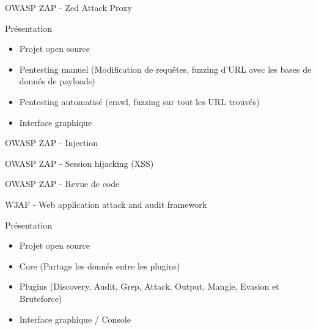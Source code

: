 \documentclass{beamer}
\begin{document}
\begin{frame}{OWASP ZAP - Zed Attack Proxy}
\begin{block}{Présentation}
	\begin{itemize}
		\item Projet open source \href{https://github.com/zaproxy/zaproxy/}{}
		\item Pentesting manuel (Modification de requêtes, fuzzing d'URL avec les bases de donnés de payloads)
		\item Pentesting automatisé (crawl, fuzzing sur tout les URL trouvés) 
		\item Interface graphique
	\end{itemize}	
\end{block}
\end{frame}



\begin{frame}{OWASP ZAP - Injection}
\begin{center}
\end{center} 
\end{frame}

\begin{frame}{OWASP ZAP - Session hijacking (XSS)}
	\begin{center}
	\end{center} 
\end{frame}

\begin{frame}{OWASP ZAP - Revue de code}
	\begin{center}
	\end{center} 
\end{frame}


\begin{frame}{ W3AF - Web application attack and audit framework}
\begin{block}{Présentation}
	\begin{itemize}
		\item Projet open source \href{http://w3af.org/}{}
		\item Core (Partage les donnés entre les plugins)
		\item Plugins (Discovery, Audit, Grep, Attack, Output, Mangle, Evasion et Bruteforce)
		\item Interface graphique / Console
	\end{itemize}	
\end{block}
\end{frame}
\end{document}
